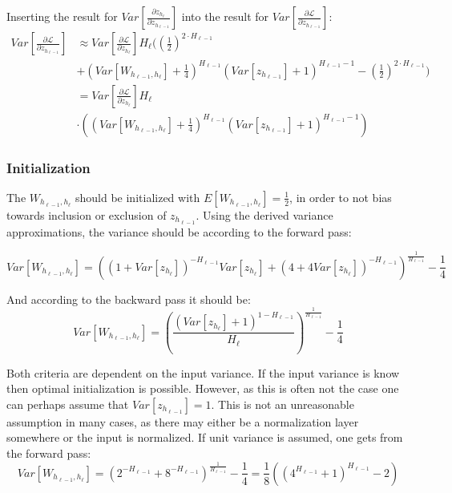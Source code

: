 Inserting the result for $Var\left[\frac{\partial z_{h_\ell}}{\partial z_{h_{\ell-1}}}\right]$ into the result for $Var\left[\frac{\partial \mathcal{L}}{\partial z_{h_{\ell-1}}}\right]$:
\begin{equation}
\begin{aligned}
Var\left[\frac{\partial \mathcal{L}}{\partial z_{h_{\ell-1}}}\right] &\approx Var\left[\frac{\partial \mathcal{L}}{\partial z_{h_\ell}}\right] H_\ell \Bigg(
\left(\frac{1}{2}\right)^{2 \cdot H_{\ell-1}} \\
&+ \left(Var[W_{h_{\ell-1},h_\ell}] + \frac{1}{4}\right)^{H_{\ell-1}} \left(Var[z_{h_{\ell-1}}] + 1\right)^{H_{\ell-1} - 1} - \left(\frac{1}{2}\right)^{2 \cdot H_{\ell-1}}\Bigg) \\
&= Var\left[\frac{\partial \mathcal{L}}{\partial z_{h_\ell}}\right] H_\ell \\
&\cdot \left(
\left(Var[W_{h_{\ell-1},h_\ell}] + \frac{1}{4}\right)^{H_{\ell-1}} \left(Var[z_{h_{\ell-1}}] + 1\right)^{H_{\ell-1} - 1}\right)
\end{aligned}
\end{equation}

\subsubsection{Initialization}
\label{sec:appendix:moments:nmu:initialization}

The $W_{h_{\ell-1},h_\ell}$ should be initialized with $E[W_{h_{\ell-1},h_\ell}] = \frac{1}{2}$, in order to not bias towards inclusion or exclusion of $z_{h_{\ell-1}}$. Using the derived variance approximations, the variance should be according to the forward pass:

\begin{equation}
Var[W_{h_{\ell-1},h_\ell}] = \left((1 + Var[z_{h_\ell}])^{-H_{\ell-1}}Var[z_{h_\ell}] + (4 + 4Var[z_{h_\ell}])^{-H_{\ell-1}}\right)^{\frac{1}{H_{\ell-1}}} - \frac{1}{4}
\end{equation}

And according to the backward pass it should be:
\begin{equation}
Var[W_{h_{\ell-1},h_\ell}] = \left( \frac{ \left(Var[z_{h_\ell}] + 1\right)^{1 - H_{\ell-1}} }{H_{\ell}} \right)^{\frac{1}{H_{\ell-1}}} - \frac{1}{4}
\end{equation}

Both criteria are dependent on the input variance. If the input variance is know then optimal initialization is possible. However, as this is often not the case one can perhaps assume that $Var[z_{h_{\ell-1}}] = 1$. This is not an unreasonable assumption in many cases, as there may either be a normalization layer somewhere or the input is normalized. If unit variance is assumed, one gets from the forward pass:
\begin{equation}
Var[W_{h_{\ell-1},h_\ell}] = \left(2^{-H_{\ell-1}} + 8^{-H_{\ell-1}}\right)^{\frac{1}{H_{\ell-1}}} - \frac{1}{4} = \frac{1}{8} \left(\left(4^{H_{\ell-1}} + 1\right)^{H_{\ell-1}} - 2\right)
\end{equation}

